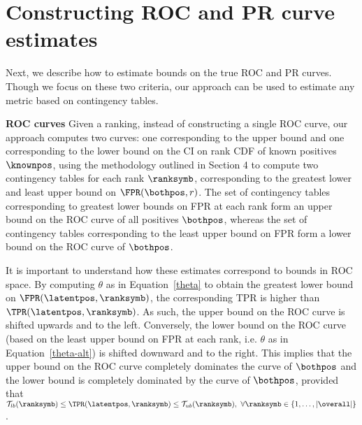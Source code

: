 \section{Constructing ROC and PR curve estimates} \label{roc-pr}

Next, we describe how to estimate bounds on the true ROC and PR curves. Though we focus on these two criteria, our approach can be used to estimate any metric based on contingency tables.%


{\bf ROC curves}
Given a ranking, instead of constructing a single ROC curve, our approach computes two curves: one corresponding to the upper bound and one corresponding to the lower bound on the CI on rank CDF of known positives $\knownpos$, using the methodology outlined in Section 4 to compute two contingency tables for each rank $\ranksymb$, corresponding to the greatest lower and least upper bound on $\FPR(\bothpos,r)$. The set of contingency tables corresponding to greatest lower bounds on FPR at each rank form an upper bound on the ROC curve of all positives $\bothpos$, whereas the set of contingency tables corresponding to the least upper bound on FPR form a lower bound on the ROC curve of $\bothpos$.


It is important to understand how these estimates correspond to bounds in ROC space. By computing $\theta$ as in Equation~\eqref{theta} to obtain the greatest lower bound on $\FPR(\latentpos,\ranksymb)$, the corresponding TPR is higher than $\TPR(\latentpos,\ranksymb)$. As such, the upper bound on the ROC curve is shifted upwards and to the left. Conversely, the lower bound on the ROC curve (based on the least upper bound on FPR at each rank, i.e. $\theta$ as in Equation~\eqref{theta-alt}) is shifted downward and to the right. This implies that the upper bound on the ROC curve completely dominates the curve of $\bothpos$ and the lower bound is completely dominated by the curve of $\bothpos$, provided that $\mathcal{T}_{lb}(\ranksymb) \leq \TPR(\latentpos,\ranksymb) \leq \mathcal{T}_{ub}(\ranksymb),\ \forall \ranksymb \in \{1,\ldots,|\overall|\}$.

